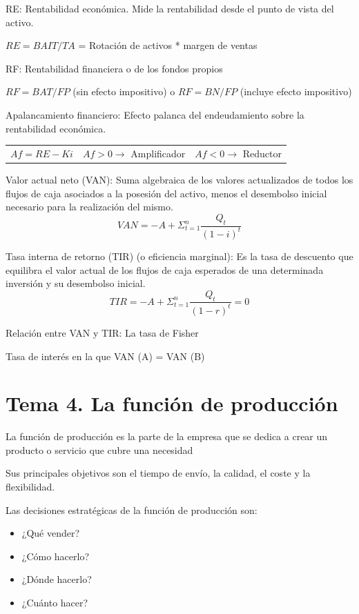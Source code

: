 \documentclass[12pt, twoside, openright]{report} %
\begin{document}
RE: Rentabilidad económica. Mide la rentabilidad desde el punto de vista del activo.

$RE = BAIT / TA$ = Rotación de activos * margen de ventas

RF: Rentabilidad financiera o de los fondos propios

$RF = BAT / FP$ (sin efecto impositivo) o $RF = BN / FP$ (incluye efecto impositivo)

Apalancamiento financiero: Efecto palanca del endeudamiento sobre la rentabilidad económica.
\begin{table}[H]
	\begin{tabular}{lll}
$Af = RE - Ki$ & $Af > 0 \rightarrow$ Amplificador & $Af < 0 \rightarrow$ Reductor
	\end{tabular}
\end{table}


Valor actual neto (VAN): Suma algebraica de los valores actualizados de todos los flujos de caja asociados a
la posesión del activo, menos el desembolso inicial necesario para la realización del mismo.
$$VAN = -A + \Sigma_{t=1}^n \frac{Q_t}{(1-i)^t}$$

Tasa interna de retorno (TIR) (o eficiencia marginal): Es la tasa de descuento que equilibra el valor actual de
los flujos de caja esperados de una determinada inversión y su desembolso inicial.
$$TIR = -A + \Sigma_{t=1}^n \frac{Q_t}{(1-r)^t}=0$$

Relación entre VAN y TIR: La tasa de Fisher

Tasa de interés en la que VAN (A) = VAN (B)



\chapter{Tema 4. La función de producción}
La función de producción es la parte de la empresa que se dedica a crear un producto o servicio que cubre una necesidad 

Sus principales objetivos son el tiempo de envío, la calidad, el coste y la flexibilidad.

Las decisiones estratégicas de la función de producción son:
\begin{itemize}
	\item ¿Qué vender?
	\item ¿Cómo hacerlo?
	\item ¿Dónde hacerlo?
	\item ¿Cuánto hacer?
\end{itemize}
\end{document}
